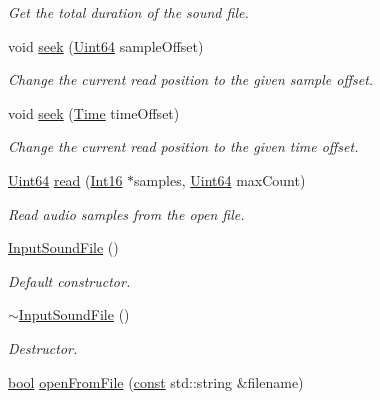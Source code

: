 \begin{DoxyCompactItemize}
\begin{DoxyCompactList}\small\item\em Get the total duration of the sound file. \end{DoxyCompactList}\item 
void \hyperlink{classsf_1_1_input_sound_file_aaf97be15020a42e159ff88f76f22af20}{seek} (\hyperlink{namespacesf_add9ac83466d96b9f50a009b9f4064266}{Uint64} sample\-Offset)
\begin{DoxyCompactList}\small\item\em Change the current read position to the given sample offset. \end{DoxyCompactList}\item 
void \hyperlink{classsf_1_1_input_sound_file_a8eee7af58ad75ddc61f93ad72e2d66c1}{seek} (\hyperlink{classsf_1_1_time}{Time} time\-Offset)
\begin{DoxyCompactList}\small\item\em Change the current read position to the given time offset. \end{DoxyCompactList}\item 
\hyperlink{namespacesf_add9ac83466d96b9f50a009b9f4064266}{Uint64} \hyperlink{classsf_1_1_input_sound_file_a83d6f64617456601edeb0daf9d14a17f}{read} (\hyperlink{namespacesf_a3c8e10435e2a310a7741755e66b5c94e}{Int16} $\ast$samples, \hyperlink{namespacesf_add9ac83466d96b9f50a009b9f4064266}{Uint64} max\-Count)
\begin{DoxyCompactList}\small\item\em Read audio samples from the open file. \end{DoxyCompactList}\item 
\hyperlink{classsf_1_1_input_sound_file_a3b95347de25d1d93a3230287cf47a077}{Input\-Sound\-File} ()
\begin{DoxyCompactList}\small\item\em Default constructor. \end{DoxyCompactList}\item 
\hyperlink{classsf_1_1_input_sound_file_a326a1a486587038123de0c187bf5c635}{$\sim$\-Input\-Sound\-File} ()
\begin{DoxyCompactList}\small\item\em Destructor. \end{DoxyCompactList}\item 
\hyperlink{term__entry_8h_a002004ba5d663f149f6c38064926abac}{bool} \hyperlink{classsf_1_1_input_sound_file_af68e54bc9bfac19554c84601156fe93f}{open\-From\-File} (\hyperlink{term__entry_8h_a57bd63ce7f9a353488880e3de6692d5a}{const} std\-::string \&filename)

\end{DoxyCompactItemize}
